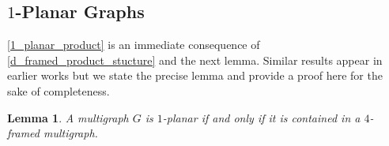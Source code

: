 \documentclass{patmorin}
\theoremstyle{plain}
\newtheorem{thm}{Theorem}
\newtheorem{lem}[thm]{Lemma}
\theoremstyle{definition}
\newcommand{\note}[2]{\noindent{\color{red}[#1:~#2]}}
\begin{document}
\subsection{\boldmath $1$-Planar Graphs}
\label{sec-1-planar}


%



%
%



\cref{1_planar_product} is an immediate consequence of \cref{d_framed_product_stucture} and the next lemma. Similar results appear in earlier works \cite{CGP06,BDGGMR,Brandenburg19,Brandenburg20} but we state the precise lemma and provide a proof here for the sake of completeness.

\begin{lem}\label{1_planar_is_4_framed}
A multigraph $G$ is $1$-planar if and only if it is contained in a $4$-framed multigraph.
\end{lem}


\end{document}

